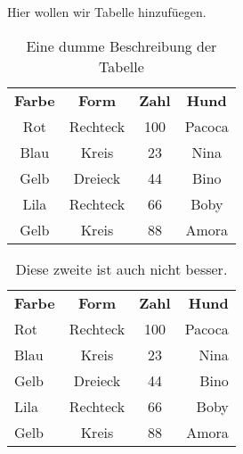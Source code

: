     Hier wollen wir Tabelle hinzufüegen.
    \begin{table}
        \centering
        \begin{tabular}{|c|c|c|c|}
            \textbf{Farbe} & \textbf{Form} &   \textbf{Zahl} & \textbf{Hund} \\
            Rot             & Rechteck      &  100           & Pacoca  \\
            Blau            & Kreis         &  23            & Nina  \\
            Gelb            & Dreieck       &  44            & Bino  \\
            Lila            & Rechteck      &  66            & Boby  \\
            Gelb            & Kreis         &  88            & Amora  \\
        \end{tabular}
        \caption{Eine dumme Beschreibung der Tabelle}
        \label{tbl:beispieltabelle1}
    \end{table}


    \begin{table}
        \centering
        \begin{tabular}{|lccr|}
            \hline
            \textbf{Farbe} & \textbf{Form} &   \textbf{Zahl} & \textbf{Hund} \\
            Rot             & Rechteck      &  100           & Pacoca  \\
            \hline
            Blau            & Kreis         &  23            & Nina  \\
            \hline
            Gelb            & Dreieck       &  44            & Bino  \\
            \hline
            Lila            & Rechteck      &  66            & Boby  \\
            \hline
            Gelb            & Kreis         &  88            & Amora  \\
            \hline
        \end{tabular}
        \caption{Diese zweite ist auch nicht besser.}
        \label{tbl:beispieltabelle1}
    \end{table}

    
    
